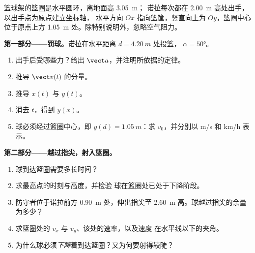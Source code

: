 \begin{problem}
\label{pb:g12:projectile-motion:1}
篮球架的篮圈是水平圆环，离地面高 \qty{3.05}{m}；
诺拉每次都在 \qty{2.00}{m} 高处出手，以出手点为原点建立坐标轴，
水平方向 $Ox$ 指向篮筐，竖直向上为 $Oy$，篮圈中心
位于原点上方 \qty{1.05}{m} 处。除特别说明外，忽略空气阻力。

\medskip\noindent\textbf{第一部分——罚球。}诺拉在水平距离
$d = \qty{4.20}{m}$ 处投篮， $\alpha = \ang{50}$。
\begin{enumerate}
  \item 出手后受哪些力？给出 $\vect a$，并注明所依据的定律。
  \item 推导 $\vect v(t)$ 的分量。
  \item 推导 $x(t)$ 与 $y(t)$。
  \item 消去 $t$，得到 $y(x)$。
  \item 球必须经过篮圈中心，即 $y(d) = \qty{1.05}{m}$：求
        $v_0$，并分别以 \unit{m/s} 和 \unit{km/h} 表示。
\end{enumerate}

\medskip\noindent\textbf{第二部分——越过指尖，射入篮圈。}
\begin{enumerate}[resume]
  \item 球到达篮圈需要多长时间？
  \item 求最高点的时刻与高度，并检验
        球在篮圈处已处于下降阶段。
  \item 防守者位于诺拉前方 \qty{0.90}{m} 处，伸出指尖至
        \qty{2.60}{m} 高。球越过指尖的余量为多少？
  \item 求篮圈处的 $v_x$ 与 $v_y$、该处的速率，以及速度
        在水平线以下的夹角。
  \item 为什么球必须\emph{下降}着到达篮圈？又为何要射得较陡？
\end{enumerate}


\end{problem}

